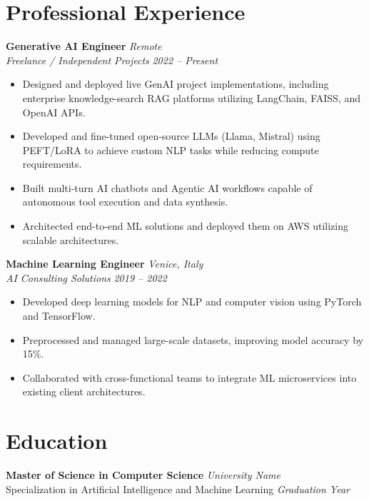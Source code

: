 \documentclass[10pt,a4paper]{article}
\begin{document}
\section*{Professional Experience}
\textbf{Generative AI Engineer} \hfill \textit{Remote} \\
\textit{Freelance / Independent Projects} \hfill \textit{2022 -- Present}
\begin{itemize}[leftmargin=*,noitemsep]
    \item Designed and deployed live GenAI project implementations, including enterprise knowledge-search RAG platforms utilizing LangChain, FAISS, and OpenAI APIs.
    \item Developed and fine-tuned open-source LLMs (Llama, Mistral) using PEFT/LoRA to achieve custom NLP tasks while reducing compute requirements.
    \item Built multi-turn AI chatbots and Agentic AI workflows capable of autonomous tool execution and data synthesis.
    \item Architected end-to-end ML solutions and deployed them on AWS utilizing scalable architectures.
\end{itemize}

\textbf{Machine Learning Engineer} \hfill \textit{Venice, Italy} \\
\textit{AI Consulting Solutions} \hfill \textit{2019 -- 2022}
\begin{itemize}[leftmargin=*,noitemsep]
    \item Developed deep learning models for NLP and computer vision using PyTorch and TensorFlow.
    \item Preprocessed and managed large-scale datasets, improving model accuracy by 15\%.
    \item Collaborated with cross-functional teams to integrate ML microservices into existing client architectures.
\end{itemize}

\section*{Education}
\textbf{Master of Science in Computer Science} \hfill \textit{University Name} \\
Specialization in Artificial Intelligence and Machine Learning \hfill \textit{Graduation Year}
\end{document}
